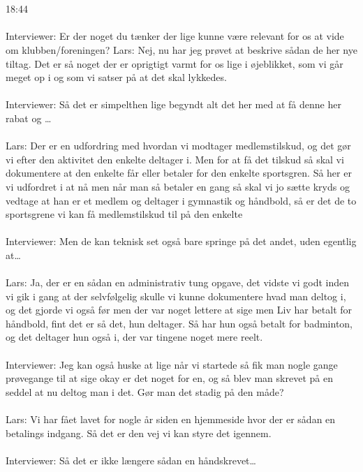 \\\\
18:44
\\\\
Interviewer: Er der noget du tænker der lige kunne være relevant for os at vide om klubben/foreningen?  
Lars: Nej, nu har jeg prøvet at beskrive sådan de her nye tiltag. Det er så noget der er oprigtigt varmt for os lige i øjeblikket, som vi går meget op i og som vi satser på at det skal lykkedes.
\\\\
Interviewer: Så det er simpelthen lige begyndt alt det her med at få denne her rabat og … 
\\\\
Lars: Der er en udfordring med hvordan vi modtager medlemstilskud, og det gør vi efter den aktivitet den enkelte deltager i. Men for at få det tilskud så skal vi dokumentere at den enkelte får eller betaler for den enkelte sportsgren. Så her er vi udfordret i at nå men når man så betaler en gang så skal vi jo sætte kryds og vedtage at han er et medlem og deltager i gymnastik og håndbold, så er det de to sportsgrene vi kan få medlemstilskud til på den enkelte
\\\\
Interviewer: Men de kan teknisk set også bare springe på det andet, uden egentlig at…
\\\\
Lars: Ja, der er en sådan en administrativ tung opgave, det vidste vi godt inden vi gik i gang at der selvfølgelig skulle vi kunne dokumentere hvad man deltog i, og det gjorde vi også før men der var noget lettere at sige men Liv har betalt for håndbold, fint det er så det, hun deltager. Så har hun også betalt for badminton, og det deltager hun også i, der var tingene noget mere reelt.
\\\\
Interviewer: Jeg kan også huske at lige når vi startede så fik man nogle gange prøvegange til at sige okay er det noget for en, og så blev man skrevet på en seddel at nu deltog man i det. Gør man det stadig på den måde?
\\\\
Lars: Vi har fået lavet for nogle år siden en hjemmeside hvor der er sådan en betalings indgang. Så det er den vej vi kan styre det igennem.
\\\\
Interviewer: Så det er ikke længere sådan en håndskrevet…
\\\\
